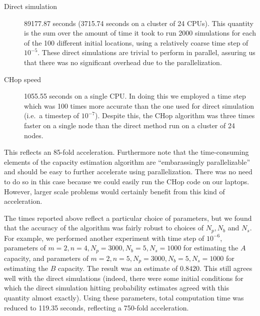 \documentclass[english, aip, jcp, priprint, graphicx,floatfix]{revtex4-1}
\theoremstyle{plain}
\theoremstyle{definition}
\theoremstyle{plain}
\begin{document}
\begin{description}
\item[Direct simulation] 89177.87 seconds (3715.74 seconds on a cluster of 24 CPUs).  This quantity is the sum over the amount of time it took to run 2000 simulations for each of the 100 different initial locations, using a relatively coarse time step of $10^{-5}$.  These direct simulations are trivial to perform in parallel, assuring us that there was no significant overhead due to the parallelization.

\item[CHop speed] 1055.55 seconds on a single CPU. In doing this we employed a time step which was 100 times more accurate than the one used for direct simulation (i.e.\ a timestep of $10^{-7}$). Despite this, the CHop algorithm was three times faster on a single node than the direct method run on a cluster of 24 nodes.

\end{description}

This reflects an 85-fold acceleration.  Furthermore note that the time-consuming elements of the capacity estimation algorithm are ``embarassingly parallelizable'' and should be easy to further accelerate using parallelization.  There was no need to do so in this case because we could easily run the CHop code on our laptops.  However, larger scale problems would certainly benefit from this kind of acceleration.  

The times reported above reflect a particular choice of parameters, but we found that the accuracy of the algorithm was fairly robust to choices of $N_p, N_b$ and $N_s$.  For example, we performed another experiment with time step of $10^{-6}$, parameters of $ m = 2, n = 4, N_p = 3000, N_b = 5, N_s = 1000 $ for estimating the $A$ capacity, and parameters of $ m = 2, n = 5, N_p = 3000, N_b = 5, N_s = 1000 $ for estimating the $B$ capacity.  The result was an estimate of $0.8420$. This still agrees well with the direct simulations (indeed, there were some initial conditions for which the direct simulation hitting probability estimates agreed with this quantity almost exactly).  Using these parameters, total computation time was reduced to 119.35 seconds, reflecting a 750-fold acceleration.


                                                    
\end{document}

